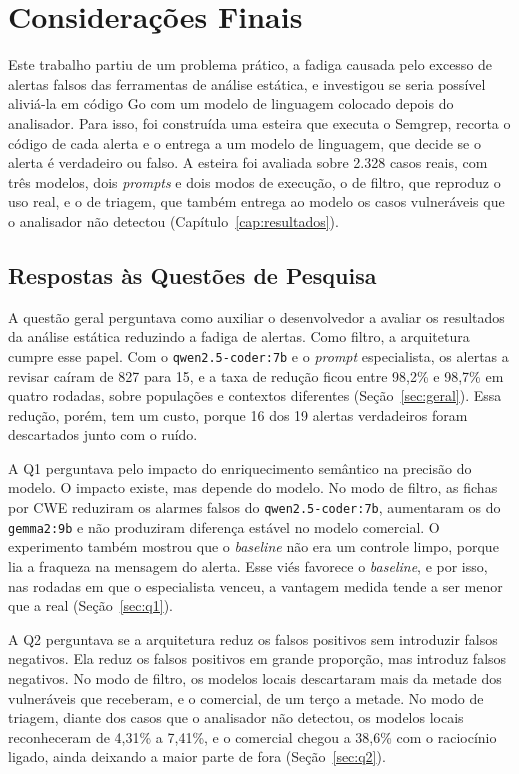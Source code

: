 \chapter{Considerações Finais}
\label{cap:consideracao}

Este trabalho partiu de um problema prático, a fadiga causada pelo excesso de alertas falsos das ferramentas de análise estática, e investigou se seria possível aliviá-la em código Go com um modelo de linguagem colocado depois do analisador. Para isso, foi construída uma esteira que executa o Semgrep, recorta o código de cada alerta e o entrega a um modelo de linguagem, que decide se o alerta é verdadeiro ou falso. A esteira foi avaliada sobre 2.328 casos reais, com três modelos, dois \textit{prompts} e dois modos de execução, o de filtro, que reproduz o uso real, e o de triagem, que também entrega ao modelo os casos vulneráveis que o analisador não detectou (Capítulo~\ref{cap:resultados}).

\section{Respostas às Questões de Pesquisa}
\label{sec:respostas}

A questão geral perguntava como auxiliar o desenvolvedor a avaliar os resultados da análise estática reduzindo a fadiga de alertas. Como filtro, a arquitetura cumpre esse papel. Com o \texttt{qwen2.5-coder:7b} e o \textit{prompt} especialista, os alertas a revisar caíram de 827 para 15, e a taxa de redução ficou entre 98,2\% e 98,7\% em quatro rodadas, sobre populações e contextos diferentes (Seção~\ref{sec:geral}). Essa redução, porém, tem um custo, porque 16 dos 19 alertas verdadeiros foram descartados junto com o ruído.

A Q1 perguntava pelo impacto do enriquecimento semântico na precisão do modelo. O impacto existe, mas depende do modelo. No modo de filtro, as fichas por CWE reduziram os alarmes falsos do \texttt{qwen2.5-coder:7b}, aumentaram os do \texttt{gemma2:9b} e não produziram diferença estável no modelo comercial. O experimento também mostrou que o \textit{baseline} não era um controle limpo, porque lia a fraqueza na mensagem do alerta. Esse viés favorece o \textit{baseline}, e por isso, nas rodadas em que o especialista venceu, a vantagem medida tende a ser menor que a real (Seção~\ref{sec:q1}).

A Q2 perguntava se a arquitetura reduz os falsos positivos sem introduzir falsos negativos. Ela reduz os falsos positivos em grande proporção, mas introduz falsos negativos. No modo de filtro, os modelos locais descartaram mais da metade dos vulneráveis que receberam, e o comercial, de um terço a metade. No modo de triagem, diante dos casos que o analisador não detectou, os modelos locais reconheceram de 4,31\% a 7,41\%, e o comercial chegou a 38,6\% com o raciocínio ligado, ainda deixando a maior parte de fora (Seção~\ref{sec:q2}).

